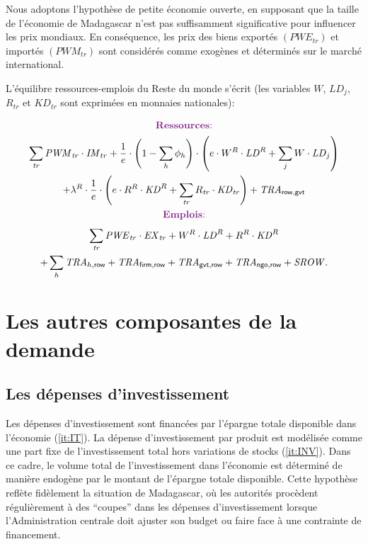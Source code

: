 \documentclass[11pt,a4paper]{article}
\newcommand{\firm}{\mathsf{firm}}
\newcommand{\gvt}{\mathsf{gvt}}
\newcommand{\ngo}{\mathsf{ngo}}
\newcommand{\row}{\mathsf{row}}
\newcommand{\tr}{\mathit{tr}}
\newcommand{\EX}{\mathit{EX}}
\newcommand{\IM}{\mathit{IM}}
\newcommand{\KD}{\mathit{KD}}
\newcommand{\LD}{\mathit{LD}}
\newcommand{\PWE}{\mathit{PWE}}
\newcommand{\PWM}{\mathit{PWM}}
\newcommand{\SROW}{\mathit{SROW}}
\newcommand{\TRA}{\mathit{TRA}}
\begin{document}
	Nous adoptons l'hypothèse de petite économie ouverte, en supposant que la taille de l'économie de Madagascar n'est pas suffisamment significative pour influencer les prix mondiaux. En conséquence, les prix des biens exportés $\left(\PWE_{\tr}\right)$ et importés $\left(\PWM_{\tr}\right)$ sont considérés comme exogènes et déterminés sur le marché international.
	
	L'équilibre ressources-emplois du Reste du monde s'écrit (les variables $W$, $\LD_{j}$, $R_{\tr}$ et $\KD_{\tr}$ sont exprimées en monnaies nationales):
	
	\begin{gather}
		\centerline{\textcolor{Fuchsia}{\textbf{Ressources}:}} \notag\\
		\sum_{\tr}^{} \PWM_{\tr}\cdot\IM_{tr} + \dfrac{1}{e}\cdot\left(1 -\sum_{h}\phi_h\right) \cdot\left(e\cdot W^R\cdot\LD^R + \sum_{j}^{} W\cdot\LD_{j}\right) \notag\\
		+ \lambda^R \cdot\dfrac{1}{e}\cdot\left(e\cdot R^R\cdot\KD^R + \sum_{\tr}^{} R_{\tr}\cdot\KD_{\tr}\right) + \TRA_{\row,\gvt}\notag\\
		\centerline{\textcolor{Fuchsia}{\textbf{Emplois}:}} \notag\\
		\sum_{\tr}^{} \PWE_{\tr}\cdot\EX_{\tr}  +  W^R\cdot\LD^R +  R^R\cdot\KD^R\notag\\
		+ \sum_{h}\TRA_{h,\row} + \TRA_{\firm,\row} + \TRA_{\gvt,\row} + \TRA_{\ngo,\row} + \SROW. \notag
	\end{gather}
	
	
	
	\section{Les autres composantes de la demande}
	\subsection{Les dépenses d'investissement}
	Les dépenses d'investissement sont financées par l'épargne totale disponible dans l'économie (\ref{it:IT}). La dépense d'investissement par produit est modélisée comme une part fixe de l'investissement total hors variations de stocks (\ref{it:INV}). Dans ce cadre, le volume total de l'investissement dans l'économie est déterminé de manière endogène par le montant de l'épargne totale disponible. Cette hypothèse reflète fidèlement la situation de Madagascar, où les autorités procèdent régulièrement à des ``coupes'' dans les dépenses d'investissement lorsque l'Administration centrale doit ajuster son budget ou faire face à une contrainte de financement.
	
\end{document}

